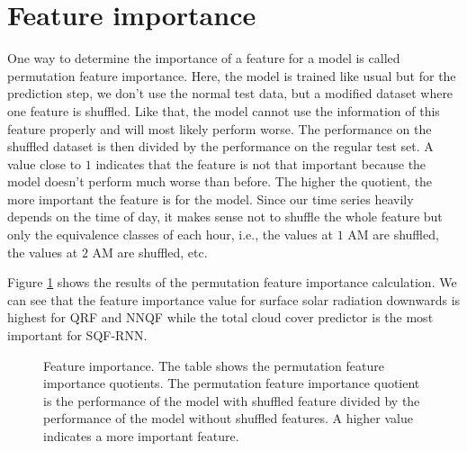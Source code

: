 \section{Feature importance}
\label{sec:feature-importance}

One way to determine the importance of a feature for a model is called 
permutation feature importance. Here, the model is trained like usual but for the prediction 
step, we don't use the normal test data, but a modified dataset where one feature is 
shuffled. Like that, the model cannot use the information of this feature properly 
and will most likely perform worse. The performance on the shuffled dataset is 
then divided by the performance on the regular test set. A value close to \(1\) 
indicates that the feature is not that important because the model doesn't perform 
much worse than before. The higher the quotient, the more important the feature is for the model.
Since our time series heavily depends on the time of day, it makes sense 
not to shuffle the whole feature but only the equivalence classes of each hour, 
i.e., the values at \(1\) AM are shuffled, the values at \(2\) AM are shuffled, etc.

Figure \ref{fig:feature-importance} 
shows the results of the permutation feature importance calculation. 
We can see that the feature importance value for surface solar radiation downwards 
is highest for QRF and NNQF while the total cloud cover predictor is the most important 
for SQF-RNN.

\begin{figure}[h!]
    
    \caption[Feature importance]{Feature importance. 
    The table shows the permutation feature importance quotients. 
    The permutation feature importance quotient is 
    the performance of the model with shuffled feature 
    divided by the performance of the model without shuffled features. 
    A higher value indicates a more important feature.}
    \label{fig:feature-importance}
\end{figure}